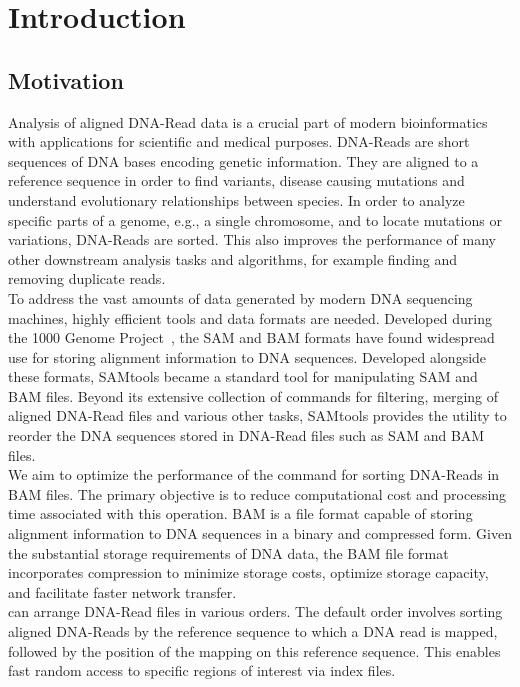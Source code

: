 \section{Introduction}

\subsection{Motivation}
Analysis of aligned DNA-Read data is a crucial part of modern bioinformatics with applications for scientific and medical purposes. DNA-Reads are short sequences of DNA bases encoding genetic information. They are aligned to a reference sequence in order to find variants, disease causing mutations and understand evolutionary relationships between species. In order to analyze specific parts of a genome, e.g., a single chromosome, and to locate mutations or variations, DNA-Reads are sorted. This also improves the performance of many other downstream analysis tasks and algorithms, for example finding and removing duplicate reads. \\

To address the vast amounts of data generated by modern DNA sequencing machines, highly efficient tools and data formats are needed. Developed during the 1000 Genome Project~\cite{the_1000_genomes_project_consortium_1000_2012}, the SAM and BAM formats have found widespread use for storing alignment information to DNA sequences. Developed alongside these formats, SAMtools became a standard tool for manipulating SAM and BAM files. Beyond its extensive collection of commands for filtering, merging of aligned DNA-Read files and various other tasks, SAMtools provides the  \sort utility to reorder the DNA sequences stored in DNA-Read files such as SAM and BAM files. \\

We aim to optimize the performance of the \sort command for sorting DNA-Reads in BAM files. The primary objective is to reduce computational cost and processing time associated with this operation. BAM is a file format capable of storing alignment information to DNA sequences in a binary and compressed form. Given the substantial storage requirements of DNA data, the BAM file format incorporates compression to minimize storage costs, optimize storage capacity, and facilitate faster network transfer.\\

\sort can arrange DNA-Read files in various orders. The default order involves sorting aligned DNA-Reads by the reference sequence to which a DNA read is mapped, followed by the position of the mapping on this reference sequence. This enables fast random access to specific regions of interest via index files. \\

